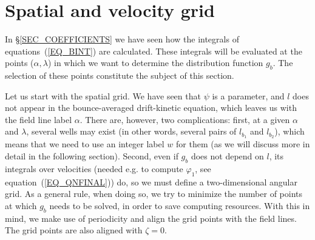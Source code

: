 
\section{Spatial and velocity grid}\label{SEC_GRID}


In \S\ref{SEC_COEFFICIENTS} we have seen how the integrals of equations~(\ref{EQ_BINT}) are calculated. These integrals will be evaluated at the points ($\alpha,\lambda$) in which we want to determine the distribution function $g_b$. The selection of these points constitute the subject of this section.

Let us start with the spatial grid. We have seen that $\psi$ is a parameter, and $l$ does not appear in the bounce-averaged drift-kinetic equation, which leaves us with the field line label $\alpha$. There are, however, two complications: first, at a given $\alpha$ and $\lambda$, several wells may exist (in other words, several pairs of $l_{b_1}$ and $l_{b_2}$), which means that we need to use an integer label $w$ for them (as we will discuss more in detail in the following section). Second, even if $g_b$ does not depend on $l$, its integrals over velocities (needed e.g. to compute $\varphi_1$, see equation~(\ref{EQ_QNFINAL})) do, so we must define a two-dimensional angular grid. As a general rule, when doing so, we try to minimize the number of points at which $g_b$ needs to be solved, in order to save computing resources. With this in mind, we make use of periodicity and align the grid points with the field lines. The grid points are also aligned with $\zeta=0$.

